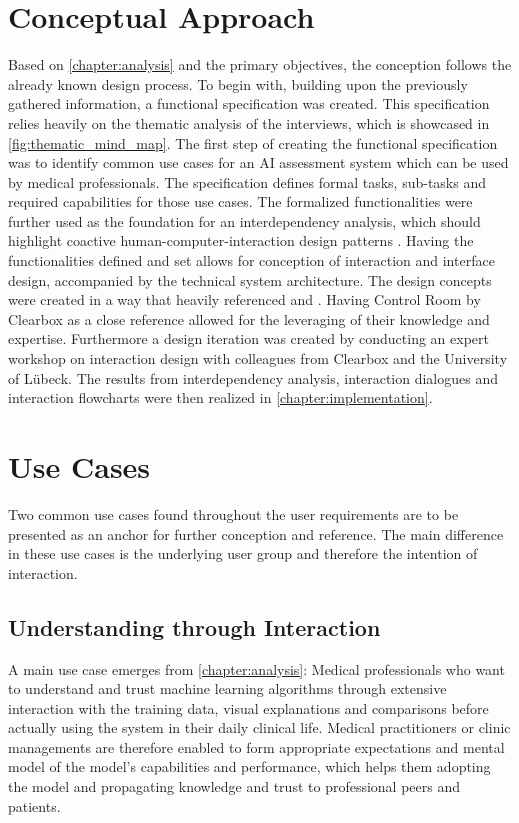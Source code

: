 \documentclass[11pt,a4paper,english]{scrreprt}
\begin{document}
\section{Conceptual Approach}\label{section:conceptual_approach}
Based on \autoref{chapter:analysis} and the primary objectives, the conception follows the already known design process. To begin with, building upon the previously gathered information, a functional specification was created. This specification relies heavily on the thematic analysis of the interviews, which is showcased in \autoref{fig:thematic_mind_map}. The first step of creating the functional specification was to identify common use cases for an AI assessment system which can be used by medical professionals. The specification defines formal tasks, sub-tasks and required capabilities for those use cases. The formalized functionalities were further used as the foundation for an interdependency analysis, which should highlight coactive human-computer-interaction design patterns \parencite{johnson_coactive_2014}. Having the functionalities defined and set allows for conception of interaction and interface design, accompanied by the technical system architecture. The design concepts were created in a way that heavily referenced \textcite{people_ai_google_website} and \textcite{clearbox_website}. Having Control Room by Clearbox as a close reference allowed for the leveraging of their knowledge and expertise. Furthermore a design iteration was created by conducting an expert workshop on interaction design with colleagues from Clearbox and the University of Lübeck. The results from interdependency analysis, interaction dialogues and interaction flowcharts were then realized in \autoref{chapter:implementation}.

\section{Use Cases}\label{section:use_cases}
Two common use cases found throughout the user requirements are to be presented as an anchor for further conception and reference. The main difference in these use cases is the underlying user group and therefore the intention of interaction.

\subsection{Understanding through Interaction}
A main use case emerges from \autoref{chapter:analysis}: Medical professionals who want to understand and trust machine learning algorithms through extensive interaction with the training data, visual explanations and comparisons before actually using the system in their daily clinical life. Medical practitioners or clinic managements are therefore enabled to form appropriate expectations and mental model of the model's capabilities and performance, which helps them adopting the model and propagating knowledge and trust to professional peers and patients.
\end{document}
